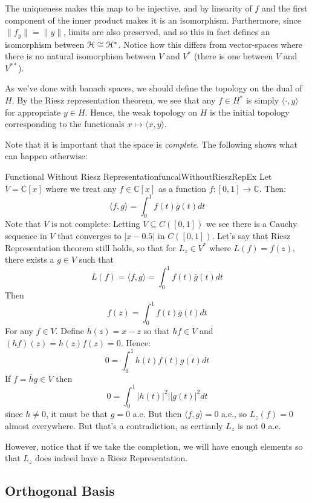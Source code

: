 \documentclass[oneside]{book}
\newcommand{\C}{\mathbb{C}}
\newcommand{\EH}{\EuScript{H}}
\newcommand{\sse}{\subseteq}
\newcommand{\oln}{\overline}
\begin{document}
The uniqueness makes this map to be injective, and by linearity of $f$ and the first component of the inner product
makes it is an isomorphism. Furthermore, since $\|f_y\| = \|y\|$, limits are also preserved, and so this in fact defines
an isomorphism between $\EH \cong \EH^*$. Notice how this differs from vector-spaces where there is no natural
isomorphism between $V$ and $V^{*}$ (there is one between $V$ and $V^{**}$).

As we've done with banach spaces, we should define the topology on the dual of $H$. By the Riesz representation
theorem, we see that any $f \in H^*$ is simply $\langle \cdot, y\rangle$ for appropriate $y \in H$. Hence, the weak
topology on $H$ is the initial topology corresponding to the functionals $x \mapsto \langle x, y\rangle$.


Note that it is important that the space is \emph{complete}. The following shows what can happen otherwise:
\begin{example}{Functional Without Riesz Representation}{funcalWithoutRieszRepEx}
	Let $V= \C[x]$ where we treat any $f \in \C[x]$ as a function $f: [0,1] \to \C$. Then:
	\[
		\langle f,g \rangle = \int_0^1 f(t)\oln{g}(t)dt
	\]
	Note that $V$ is not complete: Letting $V \sse C([0,1])$ we see there is a Cauchy sequence in $V$ that converges to
	$|x-0.5|$ in $C([0,1])$. Let's say that Riesz Representation theorem still holds, so that for $L_z \in V^*$ where
	$L(f) = f(z)$, there exists a $g \in V$ such that
	\[
		L(f) = \langle f,g \rangle = \int_0^1 f(t)\oln{g}(t)dt
	\]
	Then
	\[
		f(z)  =\int_0^1 f(t)\oln{g}(t)dt
	\]
	For any $f \in V$. Define $h(z) = x-z$ so that $hf \in V$ and $(hf)(z) = h(z)f(z) = 0$. Hence:
	\[
		0 = \int_0^1 h(t)f(t)\oln{g(t)}dt
	\]
	If $f = \oln{h}g \in V$ then
	\[
		0 = \int_0^1 |h(t)|^2||g(t)|^2dt
	\]
	since $h \ne 0$, it must be that $g = 0$ a.e. But then $ \langle f,g \rangle = 0$ a.e., so $L_z(f) = 0$ almost
	everywhere. But that's a contradiction, as certianly $L_z$ is not $0$ a.e.
\end{example}

However, notice that if we take the completion, we will have enough elements so that $L_z$ does indeed have a Riesz
Representation.

\subsection*{Orthogonal Basis}
\end{document}
